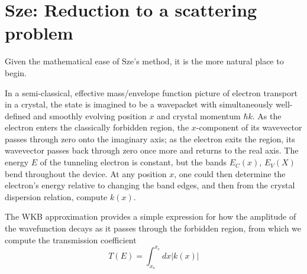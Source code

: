 \section{Sze: Reduction to a scattering problem}
Given the mathematical ease of Sze's method, it is the more natural place to begin.

In a semi-classical, effective mass/envelope function picture of electron transport in a crystal, the state is imagined to be a wavepacket with simultaneously well-defined and smoothly evolving position $x$ and crystal momentum $\hbar k$.  As the electron enters the classically forbidden region, the $x$-component of its wavevector passes through zero onto the imaginary axis; as the electron exits the region, its wavevector passes back through zero once more and returns to the real axis.  The energy $E$ of the tunneling electron is constant, but the bands $E_C(x)$, $E_V(X)$ bend throughout the device.  At any position $x$, one could then determine the electron's energy relative to changing the band edges, and then from the crystal dispersion relation, compute $k(x)$.

The WKB approximation provides a simple expression for how the amplitude of the wavefunction decays as it passes through the forbidden region, from which we compute the transmission coefficient
$$T(E)=\int_{x_v}^{x_c}dx|k(x)|$$